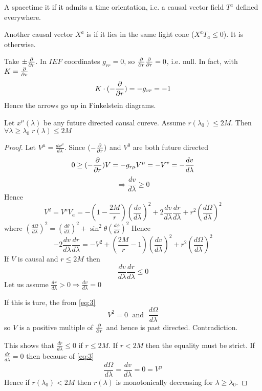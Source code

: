 \documentclass{article}
\begin{document}
\begin{definition}
A spacetime it  if it admits a time orientation, i.e. a causal vector field $T^a$ defined everywhere. 
\end{definition}


\begin{definition}
Another  causal vector $X^a$ is  if it lies in the same light cone ($X^a T_a \leq 0$). It is  otherwise.
\end{definition}

Take $\pm \frac{\partial}{\partial r}$. In $IEF$ coordinates $g_{rr}=0$, so $\frac{\partial}{\partial r} \frac{\partial}{\partial r} = 0$, i.e. null. In fact, with $K  = \frac{\partial}{\partial v}$
\[
K \cdot (-\frac{\partial}{\partial r}) = -g_{vr} = -1
\]
Hence the arrows go up in Finkelstein diagrams. 

\begin{prop}
Let $x^\mu(\lambda)$ be any future directed causal cureve. Assume $r(\lambda_0)\leq 2M$. Then $\forall \lambda \geq \lambda_0 \; r(\lambda) \leq 2M$
\end{prop}
\begin{proof}
Let $V^\mu = \frac{dx^\mu}{d\lambda}$. Since $(-\frac{\partial}{\partial r})$ and $V^0$ are both future directed 
\[
0 \geq (-\frac{\partial}{\partial r}) V = -g_{r\mu}V^\mu = -V^v = -\frac{dv}{d\lambda}
\]
\[
\Rightarrow \frac{dv}{d\lambda} \geq 0
\]
Hence 
\[
V^2 = V^a V_a = -(1-\frac{2M}{r}) (\frac{dv}{d\lambda})^2 + 2 \frac{dv}{d\lambda} \frac{dr}{d\lambda} + r^2 (\frac{d\Omega}{d\lambda})^2
\]
where $ (\frac{d\Omega}{d\lambda})^2 = (\frac{d\theta}{d\lambda})^2 + \sin^2 \theta (\frac{d\phi}{d\lambda})^2$
Hence 
\[ \label{eq:3}
-2\frac{dv}{d\lambda} \frac{dr}{d\lambda} = -V^2 + (\frac{2M}{r}-1) (\frac{dv}{d\lambda})^2 + r^2 (\frac{d\Omega}{d\lambda})^2
\]
If $V$ is causal and $r\leq 2M$ then 
\[
\frac{dv}{d\lambda} \frac{dr}{d\lambda} \leq 0 
\]
Let us assume $\frac{dr}{d\lambda} > 0 \Rightarrow \frac{dv}{d\lambda} = 0$

If this is ture, the from \ref{eq:3} 
\[
V^2 = 0 \; \text{ and } \; \frac{d\Omega}{d\lambda}
\]
so $V$ is a positive multiple of $\frac{\partial}{\partial r}$ and hence is past directed. Contradiction. 

This shows that $\frac{dr}{d\lambda} \leq 0 $ if $r\leq 2M$. If $r< 2M$ then the equality must be strict. If $\frac{dr}{d\lambda}=0$ then because of \ref{eq:3} 
\[
\frac{d\Omega}{d\lambda} = \frac{dv}{d\lambda}=0 = V^\mu
\]
Hence if $r(\lambda_0)<2M$ then $r(\lambda)$ is monotonically decreasing for $\lambda \geq \lambda_0$. 

\end{proof}
\end{document}
